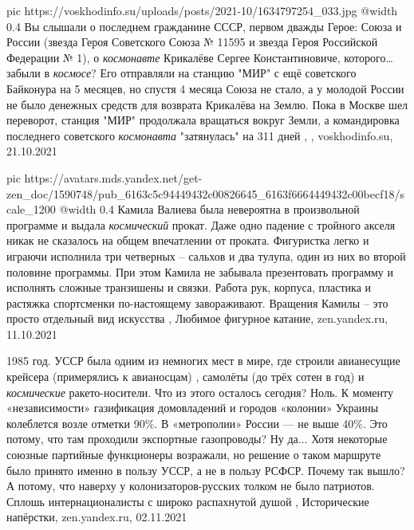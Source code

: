 \ifcmt
  pic https://voskhodinfo.su/uploads/posts/2021-10/1634797254_033.jpg
  @width 0.4
\fi
Вы слышали о последнем гражданине СССР, первом дважды Герое: Союза и России
(звезда Героя Советского Союза № 11595 и звезда Героя Российской Федерации №
1), о \emph{космонавте} Крикалёве Сергее Константиновиче, которого… забыли в
\emph{космосе}?  Его отправляли на станцию "МИР" с ещё советского Байконура на
5 месяцев, но спустя 4 месяца Союза не стало, а у молодой России не было
денежных средств для возврата Крикалёва на Землю. Пока в Москве шел переворот,
станция "МИР" продолжала вращаться вокруг Земли, а командировка последнего
советского \emph{космонавта} "затянулась" на 311 дней
, , voskhodinfo.su, 21.10.2021

\ifcmt
  pic https://avatars.mds.yandex.net/get-zen_doc/1590748/pub_6163c5c94449432c00826645_6163f6664449432c00becf18/scale_1200
  @width 0.4
\fi
Камила Валиева была невероятна в произвольной программе и выдала \emph{космический}
прокат. Даже одно падение с тройного акселя никак не сказалось на общем
впечатлении от проката. Фигуристка легко и играючи исполнила три четверных –
сальхов и два тулупа, один из них во второй половине программы. При этом Камила
не забывала презентовать программу и исполнять сложные транзишены и связки.
Работа рук, корпуса, пластика и растяжка спортсменки по-настоящему
завораживают. Вращения Камилы – это просто отдельный вид искусства
, 
Любимое фигурное катание, zen.yandex.ru, 11.10.2021 

1985 год. УССР была одним из немногих мест в мире, где строили авианесущие
крейсера (примерялись к авианосцам) , самолёты (до трёх сотен в год) и
\emph{космические} ракето-носители. Что из этого осталось сегодня? Ноль. К моменту
«независимости» газификация домовладений и городов «колонии» Украины колеблется
возле отметки 90\%. В «метрополии» России — не выше 40\%.  Это потому, что там
проходили экспортные газопроводы? Ну да... Хотя некоторые союзные партийные
функционеры возражали, но решение о таком маршруте было принято именно в пользу
УССР, а не в пользу РСФСР. Почему так вышло? А потому, что наверху у
колонизаторов-русских толком не было патриотов. Сплошь интернационалисты с
широко распахнутой душой
, 
Исторические напёрстки, zen.yandex.ru, 02.11.2021

